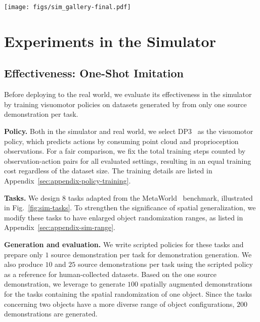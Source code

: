 \begin{figure*}
    \centering
    \texttt{[image: figs/sim\_gallery-final.pdf]}
    \vspace{-0.55cm}
    \caption{\textbf{Tasks for simulated evaluation on spatial generalization.} Purple and sky-blue rectangles mark the workspaces for demonstration generation and evaluation, respectively. The detailed sizes of these workspaces are listed in Tab.~\ref{table:sim-range} in the appendix.}
    \label{fig:sim-tasks}
\end{figure*}


\section{Experiments in the Simulator}

\subsection{Effectiveness: One-Shot Imitation}
Before deploying \method to the real world, we evaluate its effectiveness in the simulator by training visuomotor policies on datasets generated by \method from only one source demonstration per task.

\vspace{0.2cm} \noindent\textbf{Policy.}
Both in the simulator and real world, we select DP3~\cite{ze20243d} as the visuomotor policy, which predicts actions by consuming point cloud and proprioception observations. For a fair comparison, we fix the total training steps counted by observation-action pairs for all evaluated settings, resulting in an equal training cost regardless of the dataset size.
The training details are listed in Appendix~\ref{sec:appendix-policy-training}.

\vspace{0.2cm} \noindent\textbf{Tasks.}
We design $8$ tasks adapted from the MetaWorld~\cite{yu2020metaworld} benchmark, illustrated in Fig.~\ref{fig:sim-tasks}. To strengthen the significance of spatial generalization, we modify these tasks to have enlarged object randomization ranges, as listed in Appendix~\ref{sec:appendix-sim-range}.

\vspace{0.2cm} \noindent\textbf{Generation and evaluation.}
We write scripted policies for these tasks and prepare only $1$ source demonstration per task for demonstration generation. We also produce $10$ and $25$ source demonstrations per task using the scripted policy as a reference for human-collected datasets. 
Based on the one source demonstration, we leverage \method to generate $100$ spatially augmented demonstrations for the tasks containing the spatial randomization of one object. Since the tasks concerning two objects have a more diverse range of object configurations, $200$ demonstrations are generated. 

